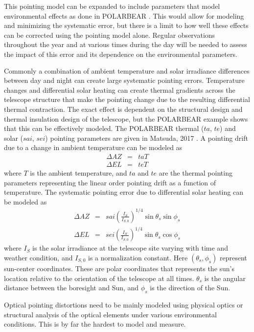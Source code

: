 This pointing model can be expanded to include parameters that model environmental effects as done in POLARBEAR \cite{polarbear14}. This would allow for modeling and minimizing the systematic error, but there is a limit to how well these effects can be corrected using the pointing model alone. Regular observations throughout the year and at various times during the day will be needed to assess the impact of this error and its dependence on the environmental parameters. 

Commonly a combination of ambient temperature and solar irradiance differences between day and night can create large systematic pointing errors. Temperature changes and differential solar heating can create thermal gradients across the telescope structure that make the pointing change due to the resulting differential thermal contraction. The exact effect is dependent on the structural design and thermal insulation design of the telescope, but the POLARBEAR example shows that this can be effectively modeled. The POLARBEAR thermal ($ta$, $te$) and solar ($sai$, $sei$) pointing parameters are given in Matsuda, 2017 \cite{Matsuda_thesis_2017}. A pointing drift due to a change in ambient temperature can be modeled as
\begin{eqnarray}
\Delta AZ & = & ta T \\
\Delta EL & = & te T
\end{eqnarray}
where $T$ is the ambient temperature, and $ta$ and $te$ are the thermal pointing parameters representing the linear order pointing drift as a function of temperature. The systematic pointing error due to differential solar heating can be modeled as
\begin{eqnarray}
\Delta AZ & = & sai \left( \frac{I_{S}}{I_{S,0}} \right)^{1/4} \sin \theta_{s} \sin \phi_{s} \\
\Delta EL & = & sei \left( \frac{I_{S}}{I_{S,0}} \right)^{1/4} \sin \theta_{s} \cos \phi_{s}
\end{eqnarray}
where $I_{S}$ is the solar irradiance at the telescope site varying with time and weather condition, and $I_{S,0}$ is a normalization constant. Here $(\theta_{s},\phi_{s})$ represent sun-center coordinates. These are polar coordinates that represents the sun's location relative to the orientation of the telescope at all times. $\theta_{s}$ is the angular distance between the boresight and Sun, and $\phi_{s}$ is the direction of the Sun. 

Optical pointing distortions need to be mainly modeled using physical optics or structural analysis of the optical elements under various environmental conditions. This is by far the hardest to model and measure.

